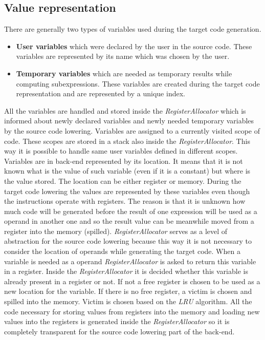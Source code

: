 \subsection{Value representation}
There are generally two types of variables used during the target code generation.
\begin{itemize}
\item \textbf{User variables} which were declared by the user in the source code. These variables are represented by its name which was chosen by the user.
\item \textbf{Temporary variables} which are needed as temporary results while computing subexpressions. These variables are created during the target code representation and are represented by a unique index.  
\end{itemize} 
All the variables are handled and stored inside the \textit{RegisterAllocator} which is informed about newly declared variables and newly needed temporary variables by the source code lowering. Variables are assigned to a currently visited scope of code. These scopes are stored in a stack also inside the \textit{RegisterAllocator}. This way it is possible to handle same user variables defined in different scopes.
Variables are in back-end represented by its location. It means that it is not known what is the value of such variable (even if it is a constant) but where is the value stored. The location can be either register or memory. During the target code lowering the values are represented by these variables even though the instructions operate with registers. The reason is that it is unknown how much code will be generated before the result of one expression will be used as a operand in another one and so the result value can be meanwhile moved from a register into the memory (spilled). \textit{RegisterAllocator} serves as a level of abstraction for the source code lowering because this way it is not necessary to consider the location of operands while generating the target code. When a variable is needed as a operand \textit{RegisterAllocator} is asked to return this variable in a register. Inside the \textit{RegisterAllocator} it is decided whether this variable is already present in a register or not. If not a free register is chosen to be used as a new location for the variable. If there is no free register, a victim is chosen and spilled into the memory. Victim is chosen based on the \textit{LRU} algorithm. All the code necessary for storing values from registers into the memory and loading new values into the registers is generated inside the \textit{RegisterAllocator} so it is completely transparent for the source code lowering part of the back-end.

